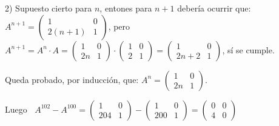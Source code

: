 \begin{proofw}
\noindent \footnotesize{\textcolor{gris}{2) Supuesto cierto para $n$, entones para $n+1$ debería ocurrir que: $A^{n+1}=\left( \begin{matrix} 1&0\\2(n+1)&1 \end{matrix} \right)$, pero $A^{n+1}= A^n\cdot A=\left( \begin{matrix} 1&0\\2n&1 \end{matrix} \right)\cdot \left( \begin{matrix} 1&0\\2&1 \end{matrix} \right)=\left( \begin{matrix} 1&0\\2n+2&1 \end{matrix} \right)$, sí se cumple.}}

\noindent \footnotesize{\textcolor{gris}{Queda probado, por inducción, que: $A^n=\left( \begin{matrix} 1&0\\2n&1 \end{matrix} \right)$}}\normalsize{.}

Luego $\; \; A^{102}-A^{100}=\left( \begin{matrix} 1&0\\204&1 \end{matrix} \right)-\left( \begin{matrix} 1&0\\200&1 \end{matrix} \right)=\left( \begin{matrix} 0&0\\4&0 \end{matrix} \right)$


\end{proofw}

